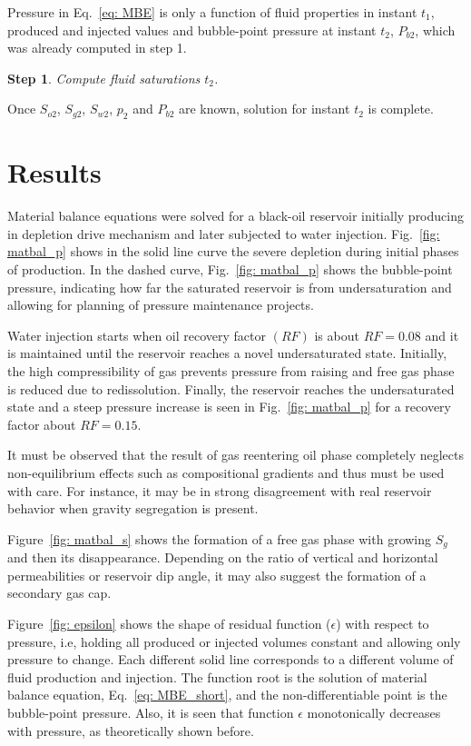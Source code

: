 \documentclass[authoryear,preprint,review,12pt]{elsarticle}
\newtheorem{step}{Step}
\begin{document}
Pressure in Eq.~\eqref{eq: MBE} is only a function of fluid properties in instant $t_1$, produced and injected values and bubble-point pressure at instant $t_2$, $P_{b2}$, which was already computed in step 1.

\begin{step}
Compute fluid saturations $t_2$.
\end{step}

Once $S_{o2}$, $S_{g2}$, $S_{w2}$, $p_2$ and $P_{b2}$ are known, solution for instant $t_2$ is complete.

\section{Results}
Material balance equations were solved for a black-oil reservoir initially producing in depletion drive mechanism and later subjected to water injection. Fig.~\ref{fig: matbal_p} shows in the solid line curve the severe depletion during initial phases of production. In the dashed curve, Fig.~\ref{fig: matbal_p} shows the bubble-point pressure, indicating how far the saturated reservoir is from undersaturation and allowing for planning of pressure maintenance projects.


Water injection starts when oil recovery factor $(RF)$ is about $RF=0.08$ and it is maintained until the reservoir reaches a novel undersaturated state. Initially, the high compressibility of gas prevents pressure from raising and free gas phase is reduced due to redissolution. Finally, the reservoir reaches the undersaturated state and a steep pressure increase is seen in Fig.~\ref{fig: matbal_p} for a recovery factor about $RF=0.15$.

It must be observed that the result of gas reentering oil phase completely neglects non-equilibrium effects such as compositional gradients and thus must be used with care. For instance, it may be in strong disagreement with real reservoir behavior when gravity segregation is present.

Figure~\ref{fig: matbal_s} shows the formation of a free gas phase with growing $S_g$ and then its disappearance. Depending on the ratio of vertical and horizontal permeabilities or reservoir dip angle, it may also suggest the formation of a secondary gas cap.

Figure~\ref{fig: epsilon} shows the shape of residual function ($\epsilon$) with respect to pressure, i.e, holding all produced or injected volumes constant and allowing only pressure to change. Each different solid line corresponds to a different volume of fluid production and injection. The function root is the solution of material balance equation, Eq.~\eqref{eq: MBE_short}, and the non-differentiable point is the bubble-point pressure. Also, it is seen that function $\epsilon$ monotonically decreases with pressure, as theoretically shown before.
\end{document}
